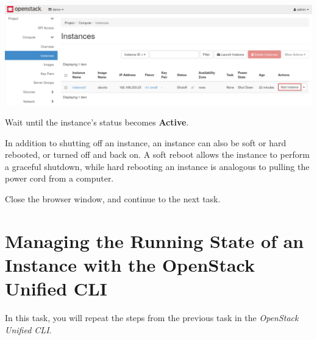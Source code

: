 \documentclass[letterpaper, 12pt]{article}
\begin{document}
\begin{enumerate}
\begin{labstep}
        \begin{center}
            \includegraphics[width=\linewidth]{images/part3/step19.png}
        \end{center}
    \end{labstep}

    \begin{stopbox}
        Wait until the instance's status becomes \textbf{Active}.
    \end{stopbox}
    \begin{tipbox}
        In addition to shutting off an instance, an instance can also be soft or hard rebooted, or turned off and back on.
        A soft reboot allows the instance to perform a graceful shutdown, while hard rebooting an instance is analogous to pulling the power cord from a computer.
    \end{tipbox}

    \begin{labstep}
        Close the browser window, and continue to the next task.
    \end{labstep}

\end{enumerate}

\section{Managing the Running State of an Instance with the OpenStack Unified CLI}\label{sec:managing-the-power-state-of-an-instance-with-the-openstack-unified-cli}
In this task, you will repeat the steps from the previous task in the \textit{OpenStack Unified CLI}.
\end{document}
